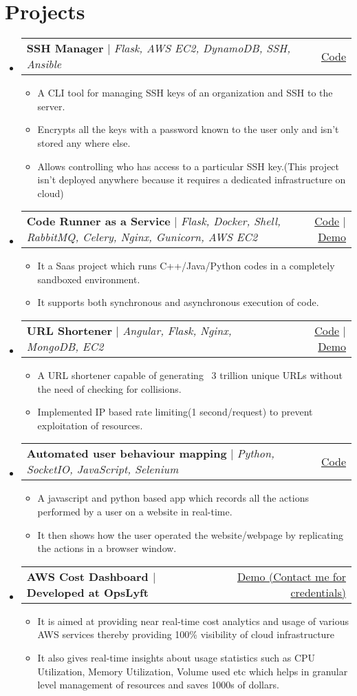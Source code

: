 \documentclass[letterpaper,11pt]{article}
\makeatletter
\newcommand{\resumeItem}[1]{
  \item\small{
    {#1 \vspace{-2pt}}
  }
}
\newcommand{\resumeProjectHeading}[2]{
    \item
    \begin{tabular*}{0.97\textwidth}{l@{\extracolsep{\fill}}r}
      \small#1 & #2 \\
    \end{tabular*}\vspace{-7pt}
}
\newcommand{\resumeSubHeadingListStart}{\begin{itemize}[leftmargin=0.15in, label={}]}
\newcommand{\resumeSubHeadingListEnd}{\end{itemize}}
\newcommand{\resumeItemListStart}{\begin{itemize}}
\newcommand{\resumeItemListEnd}{\end{itemize}\vspace{-5pt}}
\makeatother
\begin{document}
\section{Projects}
    \resumeSubHeadingListStart
      \resumeProjectHeading
          {\textbf{SSH Manager} $|$ \emph{Flask, AWS EC2, DynamoDB, SSH, Ansible}}{\href{https://github.com/thephilomaths/ssh-key-manager}{Code}}
          \resumeItemListStart
            \resumeItem{A CLI tool for managing SSH keys of an organization and SSH to the server.}
            \resumeItem{Encrypts all the keys with a password known to the user only and isn’t stored any where else.}
            \resumeItem{Allows controlling who has access to a particular SSH key.(This project isn't deployed anywhere because it requires a dedicated infrastructure on cloud)}
          \resumeItemListEnd
      \resumeProjectHeading
          {\textbf{Code Runner as a Service} $|$ \emph{Flask, Docker, Shell, RabbitMQ, Celery, Nginx, Gunicorn, AWS EC2}}{\href{https://github.com/thephilomaths/code-runner-as-a-service}{Code} $|$ \href{https://documenter.getpostman.com/view/4843397/TW76E5ZA}{Demo}}
          \resumeItemListStart
            \resumeItem{It a Saas project which runs C++/Java/Python codes in a completely sandboxed environment.}
            \resumeItem{It supports both synchronous and asynchronous execution of code.}
         \resumeItemListEnd
      \resumeProjectHeading
          {\textbf{URL Shortener} $|$ \emph{Angular, Flask, Nginx, MongoDB, EC2}}{\href{https://github.com/kartikbehl99/URL-shortener-public}{Code} $|$ \href{https://smol.ga}{Demo}}
          \resumeItemListStart
            \resumeItem{A URL shortener capable of generating ~3 trillion unique URLs without the need of checking for collisions.}
          \resumeItem{Implemented IP based rate limiting(1 second/request) to prevent exploitation of resources.}
          \resumeItemListEnd
      \resumeProjectHeading
          {\textbf{Automated user behaviour mapping} $|$ \emph{Python, SocketIO, JavaScript, Selenium}}{\href{https://github.com/kartikbehl99/automated-user-behaviour-mapping}{Code}}
          \resumeItemListStart
            \resumeItem{A javascript and python based app which records all the actions performed by a user on a website in real-time.}
            \resumeItem{It then shows how the user operated the website/webpage by replicating the actions in a browser window.}
          \resumeItemListEnd
      \resumeProjectHeading
          {\textbf{AWS Cost Dashboard $|$ Developed at OpsLyft}}{\href{https://grafana.opslyft.com}{Demo (Contact me for credentials)}}
          \resumeItemListStart
            \resumeItem{It is aimed at providing near real-time cost analytics and usage of various AWS services thereby providing 100\% visibility of cloud infrastructure}
            \resumeItem{It also gives real-time insights about usage statistics such as CPU Utilization, Memory Utilization, Volume used etc which helps in granular level management of resources and saves 1000s of dollars.}
         \resumeItemListEnd
    \resumeSubHeadingListEnd
\end{document}
